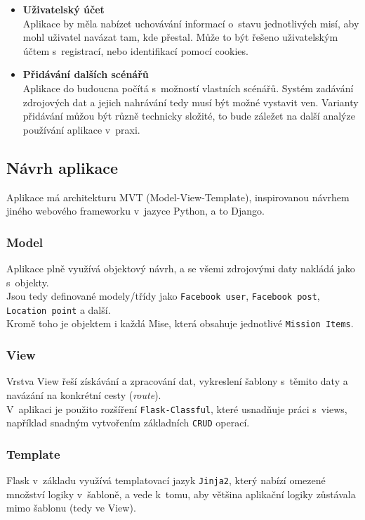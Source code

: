 \begin{itemize}
	\item \textbf{Uživatelský účet}\\
		Aplikace by měla nabízet uchovávání informací o~stavu jednotlivých misí, aby mohl uživatel navázat tam, kde přestal.
		Může to být řešeno uživatelským účtem s~registrací, nebo identifikací pomocí cookies.

	\item \textbf{Přidávání dalších scénářů}\\
		Aplikace do budoucna počítá s~možností vlastních scénářů. Systém zadávání zdrojových dat a jejich nahrávání tedy musí být možné vystavit ven.
		Varianty přidávání můžou být různě technicky složité, to bude záležet na další analýze používání aplikace v~praxi.		


\end{itemize} 

\subsection{Návrh aplikace}
Aplikace má architekturu MVT (Model-View-Template), inspirovanou návrhem jiného webového frameworku v~jazyce Python, a to Django.

\subsubsection*{Model}
Aplikace plně využívá objektový návrh, a se všemi zdrojovými daty nakládá jako s~objekty.\\
Jsou tedy definované modely/třídy jako \verb|Facebook user|, \verb|Facebook post|, \verb|Location point| a další.\\
Kromě toho je objektem i každá Mise, která obsahuje jednotlivé \verb|Mission Items|.

\subsubsection*{View}
Vrstva View řeší získávání a zpracování dat, vykreslení šablony s~těmito daty a navázání na konkrétní cesty (\textit{route}).\\
V~aplikaci je použito rozšíření \verb|Flask-Classful|, které usnadňuje práci s~views, například snadným vytvořením základních \verb|CRUD| operací.

\subsubsection*{Template}
Flask v~základu využívá templatovací jazyk \verb|Jinja2|, který nabízí omezené množství logiky v~šabloně, a vede k~tomu, aby většina aplikační logiky zůstávala mimo šablonu (tedy ve View).

